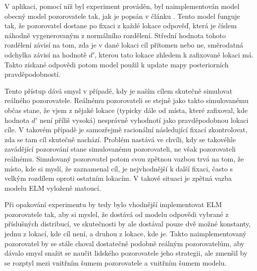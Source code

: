 V aplikaci, pomocí níž byl experiment prováděn, byl naimplementován model obecný
model pozorovatele tak, jak je popsán v článku \citep{Najemnik05}. Tento model funguje tak, že pozorovatel dostane po fixaci z každé lokace odpověď, která je číslem náhodně vygenerovaným z normálního rozdělení. Střední hodnota tohoto rozdělení závisí na tom, zda je v dané lokaci cíl přítomen nebo ne, směrodatná odchylka závisí na hodnotě $d'$, kterou tato lokace zhledem k zafixované lokaci má. Takto získané odpovědi potom model použil k update mapy posteriorních pravděpodobností.

Tento přístup dává smysl v případě, kdy je naším cílem skutečně simulovat
reálného pozorovatele. Reálnému pozorovateli se stejně jako takto simulovanému
občas stane, že vjem z nějaké lokace (typicky dále od místa, které zafixoval,
kde hodnota $d'$ není příliš vysoká) nesprávně vyhodnotí jako pravděpodobnou lokaci
cíle. V takovém případě je samozřejmě racionální následující fixací zkontrolovat, zda se tam cíl skutečně nachází. Problém nastává ve chvíli, kdy se takovéhle zavádějící pozorování stane simulovanému pozorovateli, ne však pozorovateli reálnému. Simulovaný pozorovatel potom svou zpětnou vazbou trvá na tom, že místo, kde si myslí, že zaznamenal cíl, je nejvhodnější k další fixaci, často s velkým rozdílem oproti ostatním lokacím. V takové situaci je zpětná vazba modelu ELM vyloženě matoucí. 

Při opakování experimentu by tedy bylo vhodnější implementovat ELM pozorovatele tak, aby si myslel, že dostává od modelu odpovědi vybrané z příslušných distribucí, ve skutečnosti by ale dostával pouze dvě možné konstanty, jednu z lokací, kde cíl není, a druhou z lokace, kde je. Takto naimplementovaný pozorovatel by se stále choval dostatečně podobně reálným pozorovatelům, aby dávalo smysl snažit se naučit lidského pozorovatele jeho strategii, ale zmenšil by se rozptyl mezi vnitřním šumem pozorovatele a vnitřním šumem modelu.

